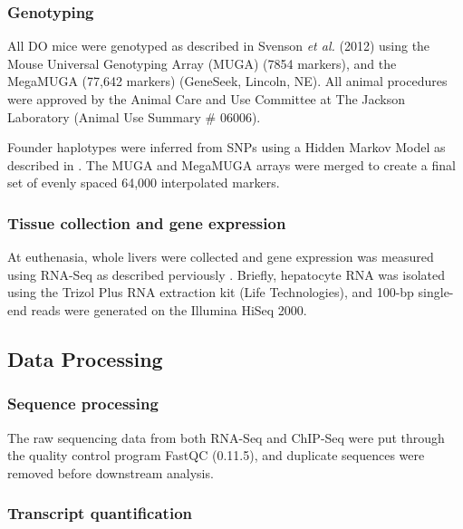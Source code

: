 \documentclass[
  11pt,
]{article}
\begin{document}
\hypertarget{genotyping}{%
\subsubsection{Genotyping}\label{genotyping}}

All DO mice were genotyped as described in Svenson \textit{et al.}
(2012) \citep{Svenson:2012hq} using the Mouse Universal Genotyping Array
(MUGA) (7854 markers), and the MegaMUGA (77,642 markers) (GeneSeek,
Lincoln, NE). All animal procedures were approved by the Animal Care and
Use Committee at The Jackson Laboratory (Animal Use Summary \# 06006).

Founder haplotypes were inferred from SNPs using a Hidden Markov Model
as described in \citet{Gatti:2014ko}. The MUGA and MegaMUGA arrays were
merged to create a final set of evenly spaced 64,000 interpolated
markers.

\hypertarget{tissue-collection-and-gene-expression}{%
\subsubsection{Tissue collection and gene
expression}\label{tissue-collection-and-gene-expression}}

At euthenasia, whole livers were collected and gene expression was
measured using RNA-Seq as described perviously
\citep{pmid27309819, pmid28592500}. Briefly, hepatocyte RNA was isolated
using the Trizol Plus RNA extraction kit (Life Technologies), and 100-bp
single-end reads were generated on the Illumina HiSeq 2000.

\hypertarget{data-processing}{%
\subsection{Data Processing}\label{data-processing}}

\hypertarget{sequence-processing}{%
\subsubsection{Sequence processing}\label{sequence-processing}}

The raw sequencing data from both RNA-Seq and ChIP-Seq were put through
the quality control program FastQC (0.11.5), and duplicate sequences
were removed before downstream analysis.

\hypertarget{transcript-quantification}{%
\subsubsection{Transcript
quantification}\label{transcript-quantification}}
\end{document}
